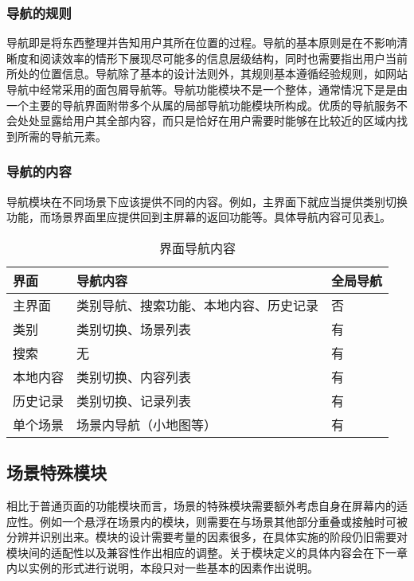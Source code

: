 \subsubsection{导航的规则}
导航即是将东西整理并告知用户其所在位置的过程。导航的基本原则是在不影响清晰度和阅读效率的情形下展现尽可能多的信息层级结构，同时也需要指出用户当前所处的位置信息。导航除了基本的设计法则外，其规则基本遵循经验规则，如网站导航中经常采用的面包屑导航等。导航功能模块不是一个整体，通常情况下是是由一个主要的导航界面附带多个从属的局部导航功能模块所构成。优质的导航服务不会处处显露给用户其全部内容，而只是恰好在用户需要时能够在比较近的区域内找到所需的导航元素。

\subsubsection{导航的内容}
导航模块在不同场景下应该提供不同的内容。例如，主界面下就应当提供类别切换功能，而场景界面里应提供回到主屏幕的返回功能等。具体导航内容可见表\ref{tab:nav}。

\begin{table}[htbp]
\centering
\caption{界面导航内容}
\vskip 5pt
\begin{tabular}{lll}
\toprule
界面 & 导航内容 & 全局导航\\
\midrule
主界面 & 类别导航、搜索功能、本地内容、历史记录 & 否\\
类别 & 类别切换、场景列表 & 有 \\
搜索 & 无 & 有 \\
本地内容 & 类别切换、内容列表 & 有 \\
历史记录 & 类别切换、记录列表 & 有 \\
单个场景 & 场景内导航（小地图等） & 有 \\
\bottomrule
\end{tabular}
\label{tab:nav}
\end{table}

\subsection{场景特殊模块}
相比于普通页面的功能模块而言，场景的特殊模块需要额外考虑自身在屏幕内的适应性。例如一个悬浮在场景内的模块，则需要在与场景其他部分重叠或接触时可被分辨并识别出来。模块的设计需要考量的因素很多，在具体实施的阶段仍旧需要对模块间的适配性以及兼容性作出相应的调整。关于模块定义的具体内容会在下一章内以实例的形式进行说明，本段只对一些基本的因素作出说明。

